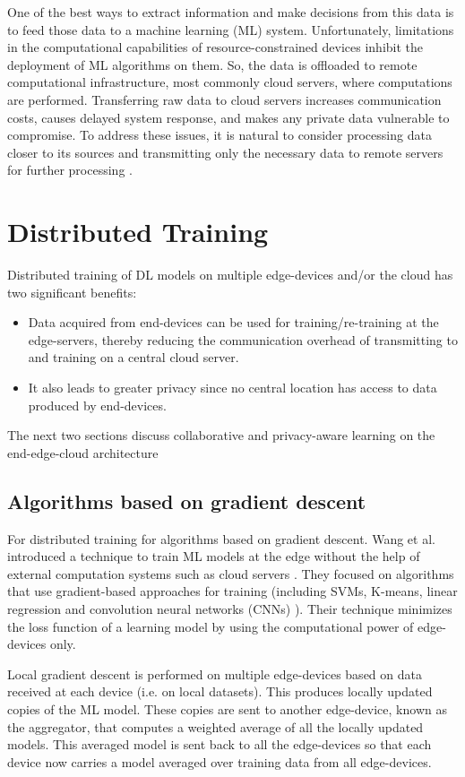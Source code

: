 \documentclass[letterpaper, 10 pt, conference]{ieeeconf}
\begin{document}
One of the best ways to extract information and make decisions from this data is to feed those data to a machine learning (ML) system. Unfortunately, limitations in the computational capabilities of resource-constrained devices inhibit the deployment of ML algorithms on them. So, the data is offloaded to remote computational infrastructure, most commonly cloud servers, where computations are performed. Transferring raw data to cloud servers increases communication costs, causes delayed system response, and makes any private data vulnerable to compromise. To address these issues, it is natural to consider processing data closer to its sources and transmitting only the necessary data to remote servers for further processing \cite{chen_editorial_2013}.

\section{Distributed Training}
Distributed training of DL models on multiple edge-devices and/or the cloud has two significant benefits:
\begin{itemize}
	\item Data acquired from end-devices can be used for training/re-training at the edge-servers, thereby reducing the communication overhead of transmitting to and training on a central cloud server.
	\item It also leads to greater privacy since no central location has access to data produced by end-devices.
\end{itemize}
The next two sections discuss collaborative and privacy-aware learning on the end-edge-cloud architecture
\subsection{Algorithms based on gradient descent}
For distributed training for algorithms based on gradient descent. Wang et al. introduced a technique to train ML models at the edge without the help of external computation systems such as cloud servers \cite{wang_when_2018}. They focused on algorithms that use gradient-based approaches for training (including SVMs, K-means, linear regression and convolution neural networks (CNNs) ). Their technique minimizes the loss function of a learning model by using the computational power of edge-devices only.

Local gradient descent is performed on multiple edge-devices based on data received at each device (i.e. on local datasets). This produces locally updated copies of the ML model. These copies are sent to another edge-device, known as the aggregator, that computes a weighted average of all the locally updated models. This averaged model is sent back to all the edge-devices so that each device now carries a model averaged over training data from all edge-devices.
\end{document}
